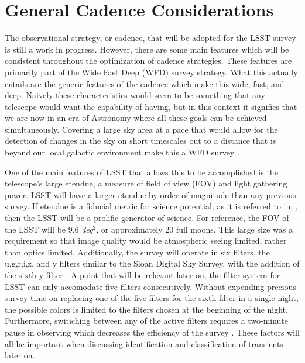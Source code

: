 \documentclass[12pt]{article}
\begin{document}
\section{General Cadence Considerations} %
The observational strategy, or cadence, that will be adopted for the LSST survey is still a work in progress. However, there are some main features which will be consistent throughout the optimization of cadence strategies. These features are primarily part of the Wide Fast Deep (WFD) survey strategy. What this actually entails are the generic features of the cadence which make this wide, fast, and deep. Naively these characteristics would seem to be something that any telescope would want the capability of having, but in this context it signifies that we are now in an era of Astronomy where all these goals can be achieved simultaneously. Covering a large sky area at a pace that would allow for the detection of changes in the sky on short timescales out to a distance that is beyond our local galactic environment make this a WFD survey \citep{LSSTScienceCollaboration2009}. \par
One of the main features of LSST that allows this to be accomplished is the telescope's large etendue, a measure of field of view (FOV) and light gathering power. LSST will have a larger etendue by order of magnitude than any previous survey. If etendue is a fiducial metric for science potential, as it is referred to in, \cite{LSSTScienceCollaboration2009}, then the LSST will be a prolific generator of science. For reference, the FOV of the LSST will be 9.6 \textit{deg}$^2$, or approximately 20 full moons. This large size was a requirement so that image quality would be atmospheric seeing limited, rather than optics limited. Additionally, the survey will operate in six filters, the u,g,r,i,z, and y filters similar to the Sloan Digital Sky Survey, with the addition of the sixth y filter \citep{LSSTScienceCollaboration2009}. A point that will be relevant later on, the filter system for LSST can only accomodate five filters consecutively. Without expending precious survey time on replacing one of the five filters for the sixth filter in a single night, the possible colors is limited to the filters chosen at the beginning of the night. Furthermore, switiching between any of the active filters requires a two-minute pause in observing which decreases the efficiency of the survey \citep{LSSTScienceCollaboration2017}. These factors will all be important when discussing identification and classification of transients later on. \par
\end{document}
